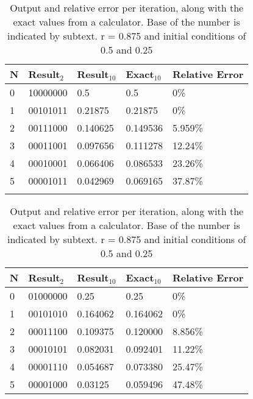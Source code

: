 \begin{table}[h]
    \caption[Logistic Map program output]{Output and relative error per iteration, along with the exact values from a calculator. Base of the number is indicated by subtext. r = 0.875 and initial conditions of 0.5 and 0.25}
    \label{tab::LogMapResults}
    \begin{center}
        \begin{tabular}{lllll}
            N & Result$_2$ & Result$_{10}$ & Exact$_{10}$ & Relative Error\\\hline
            0 & 10000000 & 0.5 & 0.5 & 0\%\\\hline
            1 & 00101011 & 0.21875 & 0.21875 & 0\%\\\hline
            2 & 00111000 & 0.140625 & 0.149536 & 5.959\%\\\hline
            3 & 00011001 & 0.097656 & 0.111278 & 12.24\%\\\hline
            4 & 00010001 & 0.066406 & 0.086533 & 23.26\%\\\hline
            5 & 00001011 & 0.042969 & 0.069165 & 37.87\%\\\hline\\
        \end{tabular}
        \begin{tabular}{lllll}
            N & Result$_2$ & Result$_{10}$ & Exact$_{10}$ & Relative Error\\\hline
            0 & 01000000 & 0.25 & 0.25 & 0\%\\\hline
            1 & 00101010 & 0.164062 & 0.164062 & 0\%\\\hline
            2 & 00011100 & 0.109375 & 0.120000 & 8.856\%\\\hline
            3 & 00010101 & 0.082031 & 0.092401 & 11.22\%\\\hline
            4 & 00001110 & 0.054687 & 0.073380 & 25.47\%\\\hline
            5 & 00001000 & 0.03125 & 0.059496 & 47.48\%\\\hline
        \end{tabular}
    \end{center}
\end{table}

